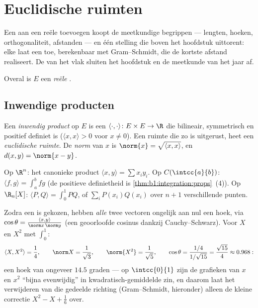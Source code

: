 \chapter{Euclidische ruimten}\label{ch:b1:euclid}

Een  aan een reële  toevoegen koopt de
meetkundige begrippen --- lengten, hoeken, orthogonaliteit,
afstanden --- en één stelling die boven het hoofdstuk uittorent:
elke  laat een  toe, berekenbaar met
Gram--Schmidt, die de kortste afstand realiseert. De  van
het vlak sluiten het hoofdstuk en de meetkunde van het jaar af.

Overal is $E$ een \emph{reële} .

\section{Inwendige producten}

\begin{definition}\label{def:b1:euclid:def}
Een \emph{inwendig product} op $E$ is een
 $\langle\cdot,\cdot\rangle \colon E \times E \to \R$ die
bilineair, symmetrisch en positief definiet is ($\langle x,
x\rangle > 0$ voor $x \neq 0$). Een  ruimte die zo
is uitgerust, heet een \emph{euclidische
ruimte}. De \emph{norm} van $x$ is
$\norm{x} = \sqrt{\langle x, x\rangle}$, en $d(x, y) = \norm{x -
y}$.
\end{definition}

\begin{example}\label{ex:b1:euclid:examples}
Op $\R^n$: het canonieke product $\langle x, y\rangle = \sum x_i
y_i$. Op $C(\intcc{a}{b})$: $\langle f, g \rangle = \int_a^b fg$ (de
positieve definietheid is \cref{thm:b1:integration:props}~(4)). Op
$\R_n[X]$: $\langle P, Q\rangle = \int_0^1 PQ$, of $\sum_{i}
P(x_i)Q(x_i)$ over $n+1$ verschillende punten.
\end{example}

\begin{example}
\label{ex:b1:euclid:polyangle}
Zodra een  is gekozen, hebben \emph{alle} twee
vectoren ongelijk aan nul een hoek, via $\cos\theta =
\frac{\langle x, y\rangle}{\norm x\,\norm y}$ (een geoorloofde
cosinus dankzij Cauchy--Schwarz). Voor $X$ en $X^2$ met
$\int_0^1$:
\[
\langle X, X^2\rangle = \frac14, \qquad
\norm X = \frac1{\sqrt3}, \qquad \norm{X^2} = \frac1{\sqrt5},
\qquad
\cos\theta = \frac{1/4}{1/\sqrt{15}} = \frac{\sqrt{15}}{4}
\approx 0.968 :
\]
een hoek van ongeveer $14.5$ graden --- op $\intcc{0}{1}$ zijn de
grafieken van $x$ en $x^2$ ``bijna evenwijdig'' in
kwadratisch-gemiddelde zin, en daarom laat het verwijderen van die
gedeelde richting (Gram--Schmidt, hieronder) alleen de kleine
correctie $X^2 - X + \frac16$ over.
\end{example}

